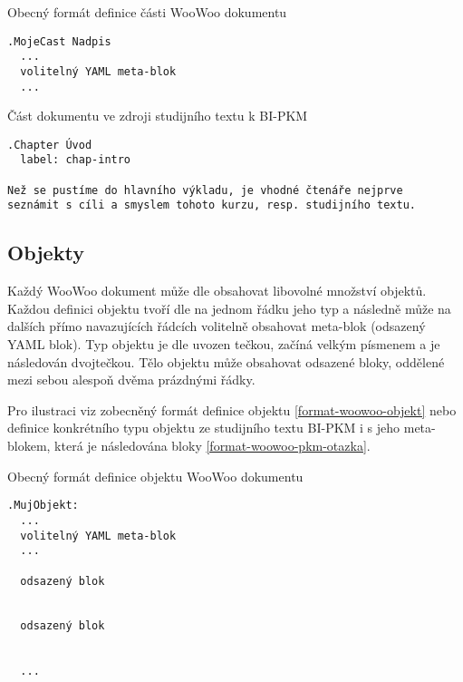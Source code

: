 \begin{listing}
    \caption{Obecný formát definice části WooWoo dokumentu}
    \label{format-woowoo-cast}
    \begin{verbatim}
.MojeCast Nadpis
  ...
  volitelný YAML meta-blok
  ...
    \end{verbatim}
\end{listing}

\begin{listing}
    \caption{Část dokumentu ve zdroji studijního textu k BI-PKM \cite{pkm}}
    \label{format-woowoo-pkm-kapitola}
    \begin{verbatim}
.Chapter Úvod
  label: chap-intro

Než se pustíme do hlavního výkladu, je vhodné čtenáře nejprve
seznámit s cíli a smyslem tohoto kurzu, resp. studijního textu.
    \end{verbatim}
\end{listing}

\subsection{Objekty}

Každý WooWoo dokument může dle \cite{woowoo} obsahovat libovolné množství objektů. Každou definici objektu tvoří dle
\cite{woowoo} na jednom řádku jeho typ a následně může na dalších přímo navazujících řádcích volitelně obsahovat
meta-blok (odsazený YAML blok). Typ objektu je dle \cite{woowoo} uvozen tečkou, začíná velkým písmenem a je následován
dvojtečkou. Tělo objektu může obsahovat odsazené bloky, oddělené mezi sebou alespoň dvěma prázdnými řádky.

Pro ilustraci viz zobecněný formát definice objektu \ref{format-woowoo-objekt} nebo definice konkrétního typu objektu ze
studijního textu BI-PKM i s jeho meta-blokem, která je následována bloky \ref{format-woowoo-pkm-otazka}.

\begin{listing}
    \caption{Obecný formát definice objektu WooWoo dokumentu}
    \label{format-woowoo-objekt}
    \begin{verbatim}
.MujObjekt:
  ...
  volitelný YAML meta-blok
  ...

  odsazený blok


  odsazený blok


  ...
    \end{verbatim}
\end{listing}

